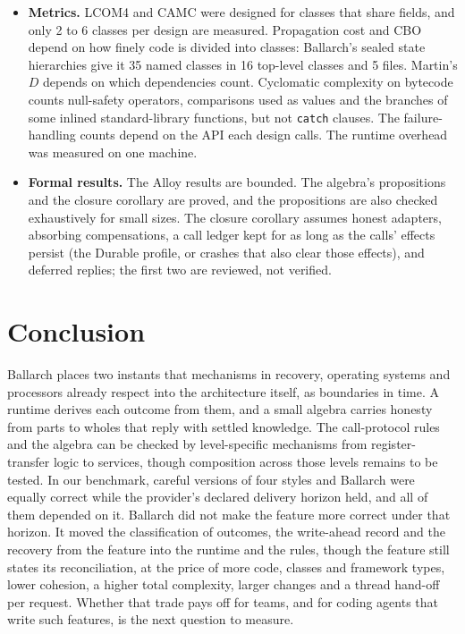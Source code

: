 \documentclass[11pt]{article}
\theoremstyle{definition}
\theoremstyle{plain}
\begin{document}
\begin{itemize}[leftmargin=*]
\begin{itemize}[nosep]
    \item The file store is single-node and has been tested against killed processes, not power loss; it is not a production database.
    \item The firmware reference records no effect class with its calls and checks only a layout fingerprint at start, so a firmware update that changes a port's effect class needs an empty call ledger or a new record schema.
  \end{itemize}
  \item \textbf{Metrics.} LCOM4 and CAMC were designed for classes that share fields, and only 2 to 6 classes per design are measured. Propagation cost and CBO depend on how finely code is divided into classes: Ballarch's sealed state hierarchies give it 35 named classes in 16 top-level classes and 5 files. Martin's $D$ depends on which dependencies count. Cyclomatic complexity on bytecode counts null-safety operators, comparisons used as values and the branches of some inlined standard-library functions, but not \texttt{catch} clauses. The failure-handling counts depend on the API each design calls. The runtime overhead was measured on one machine.
  \item \textbf{Formal results.} The Alloy results are bounded. The algebra's propositions and the closure corollary are proved, and the propositions are also checked exhaustively for small sizes. The closure corollary assumes honest adapters, absorbing compensations, a call ledger kept for as long as the calls' effects persist (the Durable profile, or crashes that also clear those effects), and deferred replies; the first two are reviewed, not verified.
\end{itemize}

\section{Conclusion}

Ballarch places two instants that mechanisms in recovery, operating systems and processors already respect into the architecture itself, as boundaries in time. A runtime derives each outcome from them, and a small algebra carries honesty from parts to wholes that reply with settled knowledge. The call-protocol rules and the algebra can be checked by level-specific mechanisms from register-transfer logic to services, though composition across those levels remains to be tested. In our benchmark, careful versions of four styles and Ballarch were equally correct while the provider's declared delivery horizon held, and all of them depended on it. Ballarch did not make the feature more correct under that horizon. It moved the classification of outcomes, the write-ahead record and the recovery from the feature into the runtime and the rules, though the feature still states its reconciliation, at the price of more code, classes and framework types, lower cohesion, a higher total complexity, larger changes and a thread hand-off per request. Whether that trade pays off for teams, and for coding agents that write such features, is the next question to measure.
\end{document}

